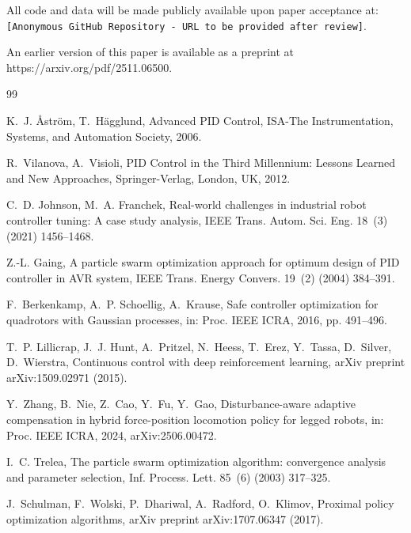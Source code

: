 \documentclass[a4paper]{cas-sc}
\begin{document}
All code and data will be made publicly available upon paper acceptance at: \texttt{[Anonymous GitHub Repository - URL to be provided after review]}.

\noindent
An earlier version of this paper is available as a preprint at https://arxiv.org/pdf/2511.06500.




\begin{thebibliography}{99}

K.~J. Åström, T.~Hägglund, Advanced PID Control, ISA-The Instrumentation, Systems, and Automation Society, 2006.

R.~Vilanova, A.~Visioli, PID Control in the Third Millennium: Lessons Learned and New Approaches, Springer-Verlag, London, UK, 2012.

C.~D. Johnson, M.~A. Franchek, Real-world challenges in industrial robot controller tuning: A case study analysis, IEEE Trans. Autom. Sci. Eng. 18~(3) (2021) 1456--1468.

Z.-L. Gaing, A particle swarm optimization approach for optimum design of PID controller in AVR system, IEEE Trans. Energy Convers. 19~(2) (2004) 384--391.

F.~Berkenkamp, A.~P. Schoellig, A.~Krause, Safe controller optimization for quadrotors with Gaussian processes, in: Proc. IEEE ICRA, 2016, pp. 491--496.

T.~P. Lillicrap, J.~J. Hunt, A.~Pritzel, N.~Heess, T.~Erez, Y.~Tassa, D.~Silver, D.~Wierstra, Continuous control with deep reinforcement learning, arXiv preprint arXiv:1509.02971 (2015).

Y.~Zhang, B.~Nie, Z.~Cao, Y.~Fu, Y.~Gao, Disturbance-aware adaptive compensation in hybrid force-position locomotion policy for legged robots, in: Proc. IEEE ICRA, 2024, arXiv:2506.00472.

I.~C. Trelea, The particle swarm optimization algorithm: convergence analysis and parameter selection, Inf. Process. Lett. 85~(6) (2003) 317--325.

J.~Schulman, F.~Wolski, P.~Dhariwal, A.~Radford, O.~Klimov, Proximal policy optimization algorithms, arXiv preprint arXiv:1707.06347 (2017).


\end{thebibliography}
\end{document}
